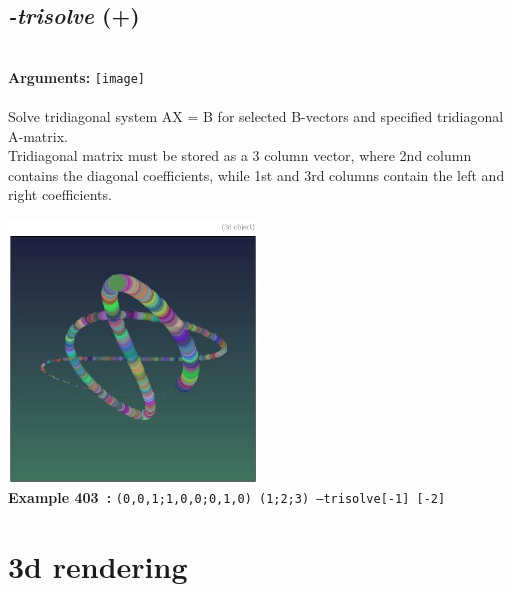 \documentclass[a4paper,11pt,twoside]{book}
\begin{document}
\subsection{\emph{-trisolve} (+)}\vspace*{-0.5em}
~\\\textbf{Arguments: } 
{\small \texttt{[image]}}\\~\\
Solve tridiagonal system AX = B for selected B-vectors and specified tridiagonal A-matrix.
~\\Tridiagonal matrix must be stored as a 3 column vector, where 2nd column contains the
diagonal coefficients, while 1st and 3rd columns contain the left and right coefficients.
\begin{center}\includegraphics[keepaspectratio=true,height=7cm,width=\textwidth]{img/gmic_def403.jpg}\\
{\footnotesize \textbf{Example 403~:} \texttt{(0,0,1;1,0,0;0,1,0) (1;2;3) --trisolve[-1] [-2]}}
\end{center}
\section{3d rendering}
\end{document}
